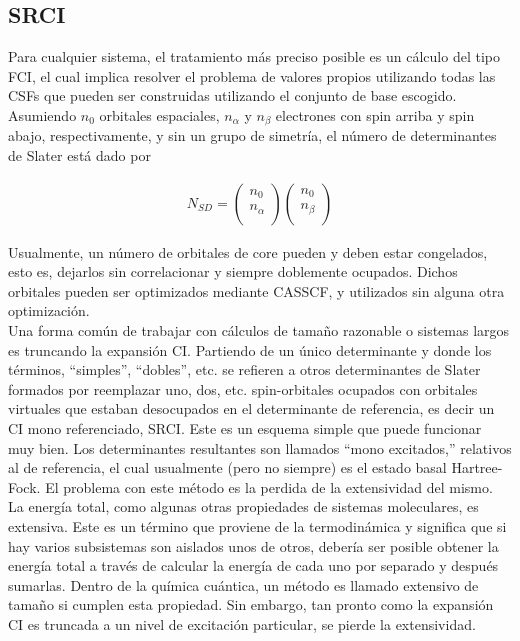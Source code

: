 \documentclass[12pt]{report}
\begin{document}
\newpage
\subsection{SRCI}
Para cualquier sistema, el tratamiento más preciso posible es un cálculo del tipo FCI, el cual implica resolver el problema de valores propios utilizando todas las CSFs que pueden ser construidas utilizando el conjunto de base escogido.
\\


Asumiendo  $n_0$ orbitales espaciales, $n_\alpha$ y $n_\beta$ electrones con spin arriba y spin abajo, respectivamente, y sin un grupo de simetría, el número de determinantes de Slater está dado por\cite{Roos2016}

\begin{align}
N_{SD}=\left(
\begin{matrix}
n_0  \\
n_\alpha \\
\end{matrix}
\right)\left(
\begin{matrix}
n_0  \\
n_\beta \\
\end{matrix}
\right)
\end{align}

Usualmente, un número de orbitales de core pueden y deben estar congelados, esto es, dejarlos sin correlacionar y siempre doblemente ocupados. Dichos orbitales pueden ser optimizados mediante CASSCF, y utilizados sin alguna otra optimización.
\\


Una forma común de trabajar con cálculos de tamaño razonable o sistemas largos es truncando la expansión CI. Partiendo de un único determinante y donde los términos, “simples”, “dobles”, etc. se refieren a otros determinantes de Slater formados por reemplazar uno, dos, etc. spin-orbitales ocupados con orbitales virtuales que estaban desocupados en el determinante de referencia, es decir un CI mono referenciado, SRCI. Este es un esquema simple que puede funcionar muy bien. Los determinantes resultantes son llamados “mono excitados,” relativos al de referencia, el cual usualmente (pero no siempre) es el estado basal Hartree-Fock. El problema con este método  es la perdida de la extensividad del mismo.
\\


La energía total, como algunas otras propiedades de sistemas moleculares, es extensiva. Este es un término que proviene de la termodinámica y significa que si hay varios subsistemas son aislados unos de otros, debería ser posible obtener la energía total a través de calcular la energía de cada uno por separado y después sumarlas. Dentro de la química cuántica, un método es llamado extensivo de tamaño si cumplen esta propiedad. Sin embargo, tan pronto como la expansión CI es truncada a un nivel de excitación particular, se pierde la extensividad.
\end{document}

